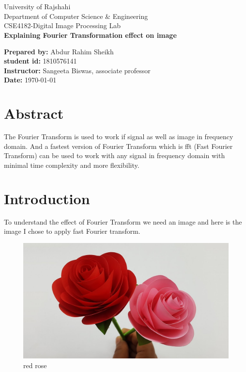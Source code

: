 \documentclass[12pt]{article}
\def \LOGOPATH {assets/ru}
\def \UNIVERSITY { University of Rajshahi}
\def \DEPARTEMENT {Department of Computer Science \&  Engineering}
\def \COURSENUM {CSE4182}
\def \COURSENAME {Digital Image Processing Lab}
\def \REPORTTITLE {Explaining Fourier Transformation effect on image}
\def \STUDENTNAME {Abdur Rahim Sheikh}
\def \STUDENTID {1810576141}
\def \INSTRUCTOR {Sangeeta Biswas, associate professor}
\begin{document}

\begin{titlepage}
    \vfill
    \begin{center}
         \\
        \hfill \\
        \Huge {\UNIVERSITY} \\
        \Large{\DEPARTEMENT} \\
        \Large{\COURSENUM\;-\;\COURSENAME} \\
        \vfill
        \textbf{\LARGE{\REPORTTITLE}}
    \end{center}
    \vfill
    \begin{center}
        \Large{\textbf{Prepared by:} \STUDENTNAME} \\
        \textbf{student id:} \STUDENTID \\
        \Large{\textbf{Instructor:} \INSTRUCTOR} \\
        \Large{\textbf{Date:} \today}
    \end{center}
    \vfill
\end{titlepage}

{
\centering
\section*{Abstract}
The Fourier Transform is used to work if signal as well as image in frequency domain. And a fastest version of Fourier Transform which is fft (Fast Fourier Transform) can be used to work with any signal in frequency domain with minimal time complexity and more flexibility.
}
\clearpage
\tableofcontents
\clearpage

\setlength{\parskip}{\baselineskip}%



\section{Introduction}

To understand the effect of Fourier Transform we need an image and here is the image I chose to apply fast Fourier transform.
\begin{figure}[H]
    \centering
    \includegraphics[width=.6\textwidth]{assets/rose.jpg}
    \caption{red rose}
    \label{fig:smile}
\end{figure}
\end{document}
